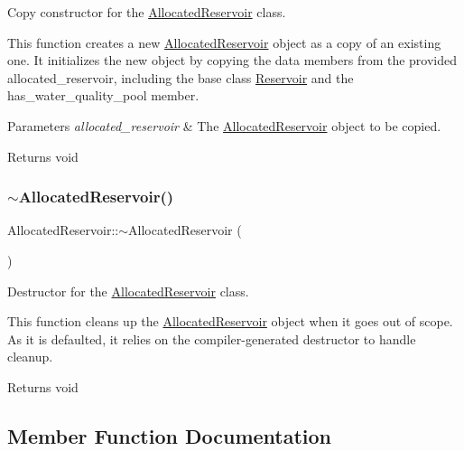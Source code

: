 Copy constructor for the \mbox{\hyperlink{classAllocatedReservoir}{Allocated\+Reservoir}} class. 

This function creates a new {\ttfamily \mbox{\hyperlink{classAllocatedReservoir}{Allocated\+Reservoir}}} object as a copy of an existing one. It initializes the new object by copying the data members from the provided {\ttfamily allocated\+\_\+reservoir}, including the base class {\ttfamily \mbox{\hyperlink{classReservoir}{Reservoir}}} and the {\ttfamily has\+\_\+water\+\_\+quality\+\_\+pool} member.


\begin{DoxyParams}{Parameters}
{\em allocated\+\_\+reservoir} & The {\ttfamily \mbox{\hyperlink{classAllocatedReservoir}{Allocated\+Reservoir}}} object to be copied.\\
\hline
\end{DoxyParams}
\begin{DoxyReturn}{Returns}
void 
\end{DoxyReturn}
\mbox{\label{classAllocatedReservoir_a3fc9aaca619a97d338449384e579900c}} 
\subsubsection{\texorpdfstring{$\sim$\+Allocated\+Reservoir()}{~AllocatedReservoir()}}
{\footnotesize\ttfamily Allocated\+Reservoir\+::$\sim$\+Allocated\+Reservoir (\begin{DoxyParamCaption}{ }\end{DoxyParamCaption})}



Destructor for the \mbox{\hyperlink{classAllocatedReservoir}{Allocated\+Reservoir}} class. 

This function cleans up the {\ttfamily \mbox{\hyperlink{classAllocatedReservoir}{Allocated\+Reservoir}}} object when it goes out of scope. As it is defaulted, it relies on the compiler-\/generated destructor to handle cleanup.

\begin{DoxyReturn}{Returns}
void 
\end{DoxyReturn}


\subsection{Member Function Documentation}
\mbox{\label{classAllocatedReservoir_a191cf4347eb2ea57b203c102f8fc805e}} 
